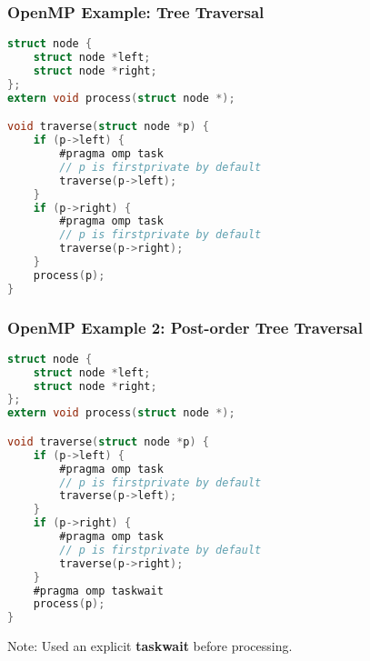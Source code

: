 \begin{frame}[fragile]
  \frametitle{OpenMP Example: Tree Traversal}

  
  \begin{lstlisting}[language=C,morekeywords={foreach,pragma,omp,parallel,single,nowait,task,untied,barrier,taskyield,mergeable,final,taskwait,critical}]
struct node {
    struct node *left;
    struct node *right;
};
extern void process(struct node *);

void traverse(struct node *p) {
    if (p->left) {
        #pragma omp task
        // p is firstprivate by default
        traverse(p->left);
    }
    if (p->right) {
        #pragma omp task
        // p is firstprivate by default
        traverse(p->right);
    }
    process(p);
}    
  \end{lstlisting}
  
\end{frame}

\begin{frame}[fragile]
  \frametitle{OpenMP Example 2: Post-order Tree Traversal}

  
  \begin{lstlisting}[language=C,morekeywords={foreach,pragma,omp,parallel,single,nowait,task,untied,barrier,taskyield,mergeable,final,taskwait,critical}]
struct node {
    struct node *left;
    struct node *right;
};
extern void process(struct node *);

void traverse(struct node *p) {
    if (p->left) {
        #pragma omp task
        // p is firstprivate by default
        traverse(p->left);
    }
    if (p->right) {
        #pragma omp task
        // p is firstprivate by default
        traverse(p->right);
    }
    #pragma omp taskwait
    process(p);
}    
  \end{lstlisting}
  
  Note: Used an explicit {\bf taskwait} before processing.
  
\end{frame}


